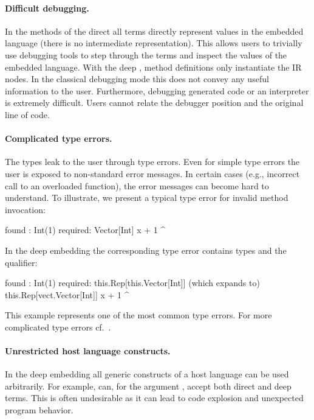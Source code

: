 
\paragraph{Difficult debugging.} In the methods of the direct \edsl{} all terms
directly represent values in the embedded language (there is no intermediate
representation). This allows users to trivially use debugging tools to step
through the terms and inspect the values of the embedded language. With the deep
\edsl{}, method definitions only instantiate the IR nodes. In the classical
debugging mode this does not convey any useful information to the user.
Furthermore, debugging generated code or an interpreter is extremely difficult.
Users cannot relate the debugger position and the original line of code.

\paragraph{Complicated type errors.} The  types leak to the user through type errors. Even for simple type errors the user is exposed to non-standard error messages. In certain cases (e.g., incorrect call to an overloaded function), the error messages can become hard to understand. To illustrate, we present a typical type error for invalid method invocation:
\begin{lstparagraph}
  found   : Int(1)
  required: Vector[Int]
       x + 1
           ^
\end{lstparagraph}
In the deep embedding the corresponding type error contains  types and the  qualifier:
\begin{lstparagraph}
  found   : Int(1)
  required: this.Rep[this.Vector[Int]]
       (which expands to) this.Rep[vect.Vector[Int]]
       x + 1
           ^
\end{lstparagraph}
This example represents one of the  most common type errors. For more complicated type errors cf.~\cite{techrep}.
\paragraph{Unrestricted host language constructs.} In the deep embedding all
generic constructs of a host language can be used arbitrarily. For example,
 can, for the argument , accept
both direct and deep terms. This is often undesirable as it can lead
 to code explosion and unexpected program behavior.

